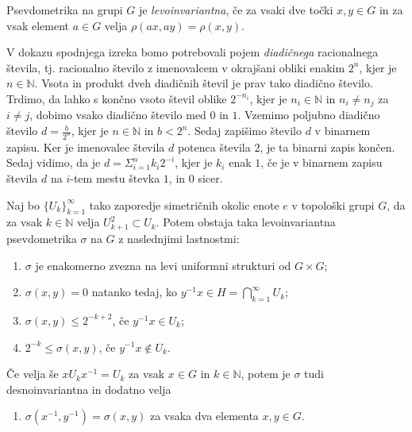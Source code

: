 \documentclass[mat1]{fmfdelo}
\newcommand{\N}{\mathbb N}
\begin{document}
\begin{definicija}
Psevdometrika na grupi $G$ je \emph{levoinvariantna}, če za vsaki dve točki $x, y \in G$ in za vsak element $a \in G$ velja $\rho(ax, ay) = \rho(x, y)$.
\end{definicija}

V dokazu spodnjega izreka bomo potrebovali pojem \emph{diadičnega} racionalnega števila, tj. racionalno število z imenovalcem v okrajšani obliki enakim $2^n$, kjer je $n \in \N$. Vsota in produkt dveh diadičnih števil je prav tako diadično število. Trdimo, da lahko s končno vsoto števil oblike $2^{-n_i}$, kjer je $n_i \in \N$ in $n_i \neq n_j$ za $i \neq j$, dobimo vsako diadično število med $0$ in $1$.
Vzemimo poljubno diadično število $d = \frac{b}{2^n}$, kjer je $n \in \N$ in $b < 2^n$. Sedaj zapišimo število $d$ v binarnem zapisu. Ker je imenovalec števila $d$ potenca števila $2$, je ta binarni zapis končen. Sedaj vidimo, da je $d = \Sigma_{i=1}^n k_i2^{-i}$, kjer je $k_i$ enak $1$, če je v binarnem zapisu števila $d$ na $i$-tem mestu števka $1$, in $0$ sicer. 

\begin{izrek}\label{izr:pseudometrika}
	Naj bo $\lbrace U_k \rbrace_{k = 1}^{\infty}$ tako zaporedje simetričnih okolic enote $e$ v topološki grupi $G$, da za vsak $k \in \N$ velja $U_{k+1}^2 \subset U_k$. Potem obstaja taka levoinvariantna psevdometrika $\sigma$ na $G$ z naslednjimi lastnostmi:
	\begin{enumerate}
		\item $\sigma$ je enakomerno zvezna na levi uniformni strukturi od $G \times G$;\label{last:psevdo1}
		\item $\sigma (x, y) = 0$ natanko tedaj, ko $y^{-1}x \in H = \bigcap_{k=1}^{\infty} U_k$;\label{last:psevdo2}
		\item $\sigma (x, y) \leq 2^{-k+2}$, če $y^{-1}x \in U_k$;\label{last:psevdo3}
		\item $2^{-k} \leq \sigma (x, y)$, če $y^{-1}x \notin U_k$.\label{last:psevdo4}
	\end{enumerate}
	
	Če velja še $x U_k x^{-1} = U_k$ za vsak $x \in G$ in $k \in \N$, potem je $\sigma$ tudi desnoinvariantna in dodatno velja
	\begin{enumerate}[resume]
		\item $\sigma (x^{-1}, y^{-1}) = \sigma (x, y)$ za vsaka dva elementa $x, y \in G$.\label{last:psevdo5}
	\end{enumerate}
\end{izrek}
\end{document}
